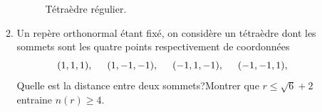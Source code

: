 \begin{enumerate}
\begin{enumerate}
\begin{figure}[h!t]
 \caption{Tétraèdre régulier.}
 \label{fig:Esphertan_3}
\end{figure}

 \item Un repère orthonormal étant fixé, on considère un tétraèdre dont les sommets sont les quatre points respectivement de coordonnées
\begin{displaymath}
 (1,1,1),\hspace{0.5cm}(1,-1,-1),\hspace{0.5cm}(-1,1,-1),\hspace{0.5cm}(-1,-1,1),\hspace{0.5cm}
\end{displaymath}
Quelle est la distance entre deux sommets?\newline Montrer que $r\leq \sqrt{6}+2$ entraine $n(r)\geq 4$.


\end{enumerate}
\end{enumerate}
